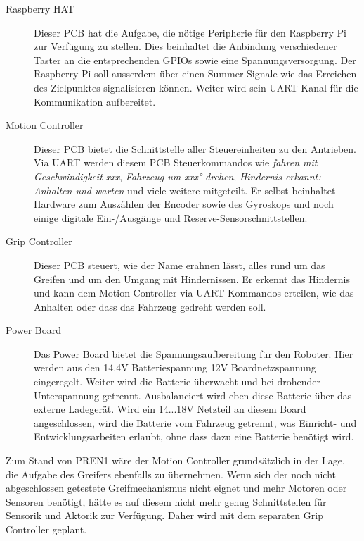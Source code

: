 \documentclass[main.tex]{subfiles} %
\begin{document}
\begin{description}
      \item[Raspberry HAT] Dieser PCB hat die Aufgabe, die nötige Peripherie für den
            Raspberry Pi zur Verfügung zu stellen. Dies beinhaltet die Anbindung
            verschiedener Taster an die entsprechenden GPIOs sowie eine
            Spannungsversorgung. Der Raspberry Pi soll ausserdem über einen Summer Signale
            wie das Erreichen des Zielpunktes signalisieren können. Weiter wird sein
            UART-Kanal für die Kommunikation aufbereitet.
      \item[Motion Controller] Dieser PCB bietet die Schnittstelle aller Steuereinheiten zu
            den Antrieben. Via UART werden diesem PCB Steuerkommandos wie \textit{fahren
                  mit Geschwindigkeit xxx}, \textit{Fahrzeug um xxx° drehen}, \textit{Hindernis
                  erkannt: Anhalten und warten} und viele weitere mitgeteilt. Er selbst
            beinhaltet Hardware zum Auszählen der Encoder sowie des Gyroskops und noch
            einige digitale Ein-/Ausgänge und Reserve-Sensorschnittstellen.
      \item[Grip Controller] Dieser PCB steuert, wie der Name erahnen lässt, alles rund um
            das Greifen und um den Umgang mit Hindernissen. Er erkennt das Hindernis und
            kann dem Motion Controller via UART Kommandos erteilen, wie das Anhalten oder
            dass das Fahrzeug gedreht werden soll.
      \item[Power Board] Das Power Board bietet die Spannungsaufbereitung für den Roboter.
            Hier werden aus den 14.4V Batteriespannung 12V Boardnetzspannung eingeregelt.
            Weiter wird die Batterie überwacht und bei drohender Unterspannung getrennt.
            Ausbalanciert wird eben diese Batterie über das externe Ladegerät. Wird ein
            14...18V Netzteil an diesem Board angeschlossen, wird die Batterie vom Fahrzeug
            getrennt, was Einricht- und Entwicklungsarbeiten erlaubt, ohne dass dazu eine
            Batterie benötigt wird.
\end{description}

Zum Stand von PREN1 wäre der Motion Controller grundsätzlich in der Lage, die
Aufgabe des Greifers ebenfalls zu übernehmen. Wenn sich der noch nicht
abgeschlossen getestete Greifmechanismus nicht eignet und mehr Motoren oder
Sensoren benötigt, hätte es auf diesem nicht mehr genug Schnittstellen für
Sensorik und Aktorik zur Verfügung. Daher wird mit dem separaten Grip
Controller geplant.
\end{document}
